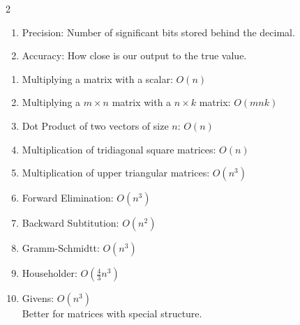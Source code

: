\documentclass[5pt, a4paper]{article}
\begin{document}
\begin{multicols}{2}
    \begin{tcolorbox}[title=Accuracy vs Precision]
        \begin{enumerate}
            \item Precision: Number of significant bits stored behind the
                decimal.
            \item Accuracy: How close is our output to the true value. 
        \end{enumerate}
    \end{tcolorbox}
    \begin{tcolorbox}[title= Common Algorithm Time Complexity]
        \begin{enumerate}
            \item Multiplying a matrix with a scalar: $O(n)$
            \item Multiplying a $m \times n$ matrix with a $n \times k$ matrix:
                $O(mnk)$
            \item Dot Product of two vectors of size $n$: $O(n)$ 
            \item Multiplication of tridiagonal square matrices: $O(n)$
            \item Multiplication of upper triangular matrices: $O(n^3)$
            \item Forward Elimination: $O(n^3)$
            \item Backward Subtitution: $O(n^2)$ 
            \item Gramm-Schmidtt: $O(n^3)$ 
            \item Householder: $O(\frac{4}{3}n^3)$
             \item Givens: $O(n^3)$ \\ Better for matrices with special
                 structure.
        \end{enumerate}
    \end{tcolorbox}

\end{multicols}
\end{document}
